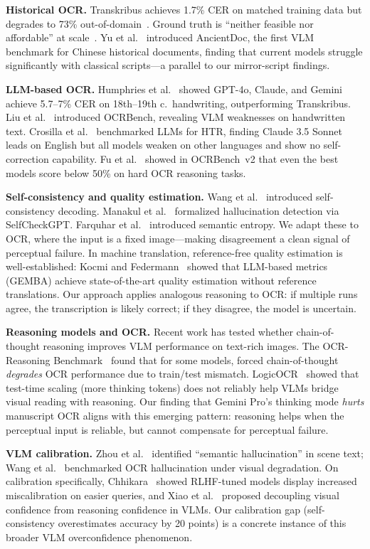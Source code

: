 \documentclass[10pt,twocolumn]{article}
\begin{document}
\textbf{Historical OCR.} Transkribus achieves 1.7\% CER on matched training data but degrades to 73\% out-of-domain~\cite{constum2022}. Ground truth is ``neither feasible nor affordable'' at scale~\cite{neudecker2021}. Yu et al.~\cite{yu2025} introduced AncientDoc, the first VLM benchmark for Chinese historical documents, finding that current models struggle significantly with classical scripts---a parallel to our mirror-script findings.

\textbf{LLM-based OCR.} Humphries et al.~\cite{humphries2024} showed GPT-4o, Claude, and Gemini achieve 5.7--7\% CER on 18th--19th c.\ handwriting, outperforming Transkribus. Liu et al.~\cite{liu2024} introduced OCRBench, revealing VLM weaknesses on handwritten text. Crosilla et al.~\cite{crosilla2025} benchmarked LLMs for HTR, finding Claude 3.5 Sonnet leads on English but all models weaken on other languages and show no self-correction capability. Fu et al.~\cite{fu2025} showed in OCRBench~v2 that even the best models score below 50\% on hard OCR reasoning tasks.

\textbf{Self-consistency and quality estimation.} Wang et al.~\cite{wang2023} introduced self-consistency decoding. Manakul et al.~\cite{manakul2023} formalized hallucination detection via SelfCheckGPT. Farquhar et al.~\cite{farquhar2024} introduced semantic entropy. We adapt these to OCR, where the input is a fixed image---making disagreement a clean signal of perceptual failure. In machine translation, reference-free quality estimation is well-established: Kocmi and Federmann~\cite{kocmi2023} showed that LLM-based metrics (GEMBA) achieve state-of-the-art quality estimation without reference translations. Our approach applies analogous reasoning to OCR: if multiple runs agree, the transcription is likely correct; if they disagree, the model is uncertain.

\textbf{Reasoning models and OCR.} Recent work has tested whether chain-of-thought reasoning improves VLM performance on text-rich images. The OCR-Reasoning Benchmark~\cite{ocrr2025} found that for some models, forced chain-of-thought \emph{degrades} OCR performance due to train/test mismatch. LogicOCR~\cite{ye2025} showed that test-time scaling (more thinking tokens) does not reliably help VLMs bridge visual reading with reasoning. Our finding that Gemini Pro's thinking mode \emph{hurts} manuscript OCR aligns with this emerging pattern: reasoning helps when the perceptual input is reliable, but cannot compensate for perceptual failure.

\textbf{VLM calibration.} Zhou et al.~\cite{zhou2025} identified ``semantic hallucination'' in scene text; Wang et al.~\cite{wang2025} benchmarked OCR hallucination under visual degradation. On calibration specifically, Chhikara~\cite{chhikara2025} showed RLHF-tuned models display increased miscalibration on easier queries, and Xiao et al.~\cite{xiao2026} proposed decoupling visual confidence from reasoning confidence in VLMs. Our calibration gap (self-consistency overestimates accuracy by 20 points) is a concrete instance of this broader VLM overconfidence phenomenon.
\end{document}
